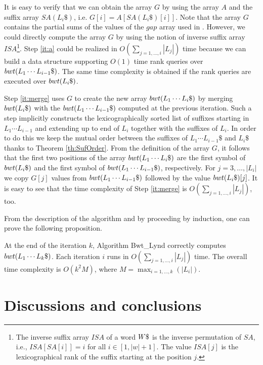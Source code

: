 \documentclass[envcountsame,runningheads]{llncs}
\begin{document}
It is easy to verify that we can obtain the array $G$ by using the array $A$ and the suffix array $SA(L_i\$)$,
i.e. $G[i] = A[SA(L_i\$)[i]]$. Note that the array $G$ contains the partial sums of the values of the $gap$ array used in \cite{CrauserF02,FerraginaGagieManzini2012}. However, we could directly compute the array $G$ by using the notion of inverse suffix array $ISA$\footnote{The inverse suffix array $ISA$ of a word $\bigT\$$ is the inverse permutation of $SA$, i.e., $ISA[SA[i]] = i$ for all $i \in [1, |w|+1]$. The value $ISA[j]$ is the lexicographical rank of the suffix starting at the position $j$.}. Step \ref{it:a} could be realized in $O(\sum_{j=1,\ldots,i}{|L_j|})$ time because we can build a data structure supporting $O(1)$ time rank queries over ${bwt}(L_1 \cdots L_{i-1}\$)$. The same time complexity is obtained if the rank queries are executed over ${bwt}(L_i\$)$.

Step \ref{it:merge} uses $G$ to create the new array ${bwt}(L_1 \cdots L_{i}\$)$ by merging ${bwt}(L_{i}\$)$ with the ${bwt}(L_1 \cdots L_{i-1}\$)$ computed at the previous iteration. Such a step implicitly constructs the lexicographically sorted list of suffixes starting in $L_1 \cdots L_{i-1}$ and extending up to end of $L_i$ together with the suffixes of $L_i$. In order to do this we keep the mutual order between the suffixes of $L_1 \cdots L_{i-1}\$$ and $L_i\$$ thanks to Theorem \ref{th:SufOrder}. From the definition of the array $G$, it follows that the first two positions of the array ${bwt}(L_1 \cdots L_{i}\$)$ are the first symbol of ${bwt}(L_{i}\$)$ and the first symbol of ${bwt}(L_1 \cdots L_{i-1}\$)$, respectively.
For $j = 3, \ldots, |L_{i}|$ we copy $G[j]$ values from ${bwt}(L_1 \cdots L_{i-1}\$)$ followed by the value ${bwt}(L_{i}\$)[j]$. It is easy to see that the time complexity of Step \ref{it:merge} is $O(\sum_{j=1,\ldots,i}{|L_j|})$, too.

From the description of the algorithm and by proceeding by induction, one can prove the following proposition.
\begin{proposition}
At the end of the iteration $k$, Algorithm {\sc Bwt\_Lynd} correctly computes ${bwt}(L_1 \cdots L_{k}\$)$. Each iteration $i$ runs in $O(\sum_{j=1,\ldots,i}{|L_j|})$ time. The overall time complexity is $O(k^2M)$, where $M=\max_{i=1,\ldots,k}(|L_i|)$.
\end{proposition}


\section{Discussions and conclusions}\label{sec:conclusion}
\end{document}
